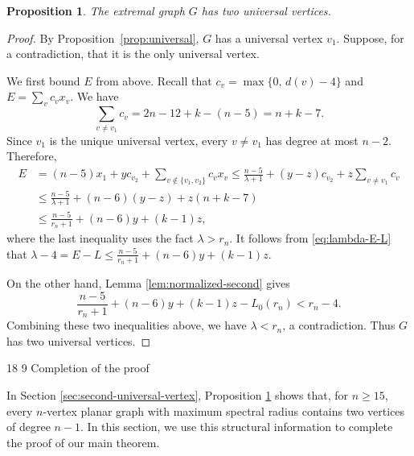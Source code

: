 \documentclass[11pt]{article}
\makeatletter
\renewcommand\section{\@startsection{section}{1}{\z@}%
{18\p@ \@plus 6\p@ \@minus 3\p@}%
{9\p@ \@plus 6\p@ \@minus 3\p@}%
{\large\bfseries\boldmath}}
\theoremstyle{plain}
\newtheorem{proposition}{Proposition}[section]
\theoremstyle{definition}
\numberwithin{equation}{section}
\makeatother
\begin{document}
\begin{proposition}\label{prop:two-universal}
The extremal graph $G$ has two universal vertices.
\end{proposition}

\begin{proof}
By Proposition~\ref{prop:universal}, $G$ has
a universal vertex $v_1$. Suppose, for a contradiction, that it is the only universal vertex. 

We first bound $E$ from above. Recall that $c_v = \max\{0,\, d(v) - 4\}$ and $E = \sum_{v} c_vx_v$. We have
\begin{equation}\label{eq:sum-v-v1}
\sum_{v\neq v_1} c_v = 2n-12+k - (n-5) = n + k - 7.
\end{equation}
Since $v_1$ is the unique universal vertex, every $v\neq v_1$ has degree at most $n-2$. Therefore,
\begin{align*}
E & = (n-5) x_1 + yc_{v_2} + \sum_{v\notin\{v_1,v_2\}} c_vx_v 
\leq \frac{n-5}{\lambda + 1} + (y-z) c_{v_2} + z\sum_{v\neq v_1} c_v \\
& \leq \frac{n-5}{\lambda + 1} + (n-6)(y-z) + z(n + k - 7) \\
& \leq \frac{n - 5}{r_n + 1} + (n - 6)y + (k - 1)z,
\end{align*}
where the last inequality uses the fact $\lambda > r_n$.
It follows from \eqref{eq:lambda-E-L} that
$\lambda - 4 = E - L \leq \frac{n - 5}{r_n + 1} + (n - 6)y + (k - 1)z$.

On the other hand, Lemma \ref{lem:normalized-second} gives
\[
\frac{n-5}{r_n + 1} + (n - 6)y + (k-1) z - L_0(r_n) < r_n - 4.
\]
Combining these two inequalities above, we have $\lambda < r_n$,
a contradiction. Thus $G$ has two
universal vertices.
\end{proof}

\section{Completion of the proof}
\label{sec:finish-proof}

In Section \ref{sec:second-universal-vertex}, Proposition \ref{prop:two-universal} shows that, 
for $n\geq 15$, every $n$-vertex planar graph with maximum spectral radius contains two
vertices of degree $n-1$. In this section, we use this structural
information to complete the proof of our main theorem.
\end{document}
